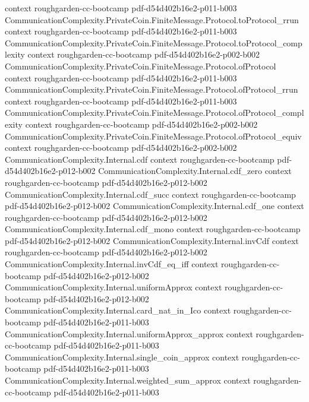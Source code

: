 \begin{theorem}
  {context}
  {roughgarden-cc-bootcamp}
  {pdf-d54d402b16e2-p011-b003}
\proofstep
  {CommunicationComplexity.PrivateCoin.FiniteMessage.Protocol.toProtocol_rrun}
  {context}
  {roughgarden-cc-bootcamp}
  {pdf-d54d402b16e2-p011-b003}
\proofstep
  {CommunicationComplexity.PrivateCoin.FiniteMessage.Protocol.toProtocol_complexity}
  {context}
  {roughgarden-cc-bootcamp}
  {pdf-d54d402b16e2-p002-b002}
\proofstep
  {CommunicationComplexity.PrivateCoin.FiniteMessage.Protocol.ofProtocol}
  {context}
  {roughgarden-cc-bootcamp}
  {pdf-d54d402b16e2-p011-b003}
\proofstep
  {CommunicationComplexity.PrivateCoin.FiniteMessage.Protocol.ofProtocol_rrun}
  {context}
  {roughgarden-cc-bootcamp}
  {pdf-d54d402b16e2-p011-b003}
\proofstep
  {CommunicationComplexity.PrivateCoin.FiniteMessage.Protocol.ofProtocol_complexity}
  {context}
  {roughgarden-cc-bootcamp}
  {pdf-d54d402b16e2-p002-b002}
\proofstep
  {CommunicationComplexity.PrivateCoin.FiniteMessage.Protocol.ofProtocol_equiv}
  {context}
  {roughgarden-cc-bootcamp}
  {pdf-d54d402b16e2-p002-b002}
\proofstep
  {CommunicationComplexity.Internal.cdf}
  {context}
  {roughgarden-cc-bootcamp}
  {pdf-d54d402b16e2-p012-b002}
\proofstep
  {CommunicationComplexity.Internal.cdf_zero}
  {context}
  {roughgarden-cc-bootcamp}
  {pdf-d54d402b16e2-p012-b002}
\proofstep
  {CommunicationComplexity.Internal.cdf_succ}
  {context}
  {roughgarden-cc-bootcamp}
  {pdf-d54d402b16e2-p012-b002}
\proofstep
  {CommunicationComplexity.Internal.cdf_one}
  {context}
  {roughgarden-cc-bootcamp}
  {pdf-d54d402b16e2-p012-b002}
\proofstep
  {CommunicationComplexity.Internal.cdf_mono}
  {context}
  {roughgarden-cc-bootcamp}
  {pdf-d54d402b16e2-p012-b002}
\proofstep
  {CommunicationComplexity.Internal.invCdf}
  {context}
  {roughgarden-cc-bootcamp}
  {pdf-d54d402b16e2-p012-b002}
\proofstep
  {CommunicationComplexity.Internal.invCdf_eq_iff}
  {context}
  {roughgarden-cc-bootcamp}
  {pdf-d54d402b16e2-p012-b002}
\proofstep
  {CommunicationComplexity.Internal.uniformApprox}
  {context}
  {roughgarden-cc-bootcamp}
  {pdf-d54d402b16e2-p012-b002}
\proofstep
  {CommunicationComplexity.Internal.card_nat_in_Ico}
  {context}
  {roughgarden-cc-bootcamp}
  {pdf-d54d402b16e2-p011-b003}
\proofstep
  {CommunicationComplexity.Internal.uniformApprox_approx}
  {context}
  {roughgarden-cc-bootcamp}
  {pdf-d54d402b16e2-p011-b003}
\proofstep
  {CommunicationComplexity.Internal.single_coin_approx}
  {context}
  {roughgarden-cc-bootcamp}
  {pdf-d54d402b16e2-p011-b003}
\proofstep
  {CommunicationComplexity.Internal.weighted_sum_approx}
  {context}
  {roughgarden-cc-bootcamp}
  {pdf-d54d402b16e2-p011-b003}

\end{theorem}
